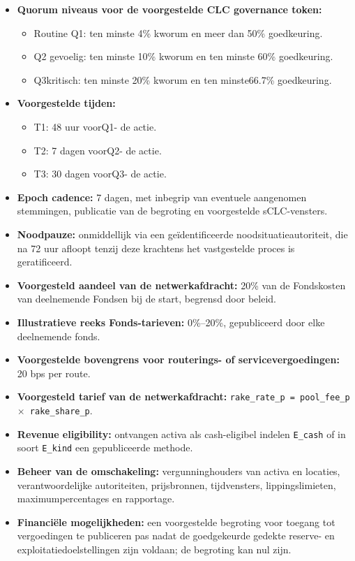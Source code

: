 \documentclass[11pt]{article}
\begin{document}
\begin{itemize}[leftmargin=*]
\item \textbf{Quorum niveaus voor de voorgestelde CLC governance token:}
\begin{itemize}[leftmargin=*]
\item Routine Q1: ten minste 4\% kworum en meer dan 50\% goedkeuring.
\item Q2 gevoelig: ten minste 10\% kworum en ten minste 60\% goedkeuring.
\item Q3kritisch: ten minste 20\% kworum en ten minste66.7\% goedkeuring.
\end{itemize}
\item \textbf{Voorgestelde tijden:}
\begin{itemize}[leftmargin=*]
\item T1: 48 uur voorQ1- de actie.
\item T2: 7 dagen voorQ2- de actie.
\item T3: 30 dagen voorQ3- de actie.
\end{itemize}
\item \textbf{Epoch cadence:} 7 dagen, met inbegrip van eventuele aangenomen stemmingen, publicatie van de begroting en voorgestelde sCLC-vensters.
\item \textbf{Noodpauze:} onmiddellijk via een geïdentificeerde noodsituatieautoriteit, die na 72 uur afloopt tenzij deze krachtens het vastgestelde proces is geratificeerd.
\item \textbf{Voorgesteld aandeel van de netwerkafdracht:} 20\% van de Fondskosten van deelnemende Fondsen bij de start, begrensd door beleid.
\item \textbf{Illustratieve reeks Fonds-tarieven:} 0\%--20\%, gepubliceerd door elke deelnemende fonds.
\item \textbf{Voorgestelde bovengrens voor routerings- of servicevergoedingen:} 20 bps per route.
\item \textbf{Voorgesteld tarief van de netwerkafdracht:} \texttt{rake\_rate\_p = pool\_fee\_p $\times$ rake\_share\_p}.
\item \textbf{Revenue eligibility:} ontvangen activa als cash-eligibel indelen \texttt{E\_cash} of in soort \texttt{E\_kind} een gepubliceerde methode.
\item \textbf{Beheer van de omschakeling:} vergunninghouders van activa en locaties, verantwoordelijke autoriteiten, prijsbronnen, tijdvensters, lippingslimieten, maximumpercentages en rapportage.
\item \textbf{Financiële mogelijkheden:} een voorgestelde begroting voor toegang tot vergoedingen te publiceren pas nadat de goedgekeurde gedekte reserve- en exploitatiedoelstellingen zijn voldaan; de begroting kan nul zijn.

\end{itemize}
\end{document}
